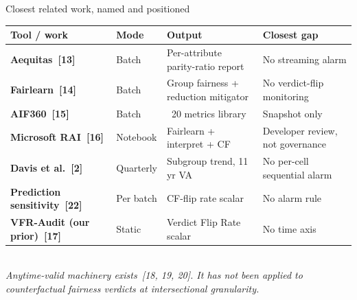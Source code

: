 \documentclass[aspectratio=169,11pt]{beamer}
\begin{document}
\begin{frame}{Closest related work, named and positioned}
\centering
\scriptsize
\setlength{\arrayrulewidth}{0.8pt}
\begin{tabular}{>{\bfseries}p{3.5cm} p{1.6cm} p{4.4cm} p{4.1cm}}
\toprule
\rowcolor{ink}
{\color{paper}\textbf{Tool / work}} & {\color{paper}\textbf{Mode}} & {\color{paper}\textbf{Output}} & {\color{paper}\textbf{Closest gap}} \\
\midrule
Aequitas~[13]                & Batch & Per-attribute parity-ratio report & No streaming alarm \\
\rowcolor{soft} Fairlearn~[14]              & Batch & Group fairness + reduction mitigator & No verdict-flip monitoring \\
AIF360~[15]                  & Batch & ~20 metrics library              & Snapshot only \\
\rowcolor{soft} Microsoft RAI~[16]          & Notebook & Fairlearn + interpret + CF       & Developer review, not governance \\
Davis et al.~[2]             & Quarterly & Subgroup trend, 11 yr VA      & No per-cell sequential alarm \\
\rowcolor{soft} Prediction sensitivity~[22] & Per batch & CF-flip rate scalar           & No alarm rule \\
VFR-Audit (our prior)~[17]   & Static & Verdict Flip Rate scalar         & No time axis \\
\bottomrule
\end{tabular}
\vspace{4pt}\\
{\footnotesize\color{muted}\itshape Anytime-valid machinery exists~[18, 19, 20]. It has not been applied to counterfactual fairness verdicts at intersectional granularity.}
\end{frame}
\end{document}
